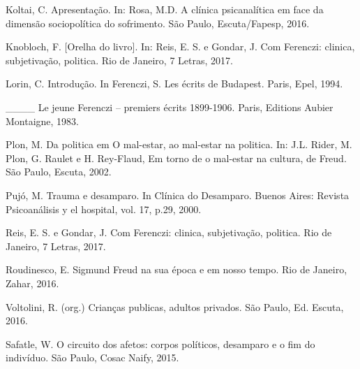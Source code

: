 Koltai, C. Apresentação. In: Rosa, M.D. A clínica psicanalítica em face
da dimensão sociopolítica do sofrimento. São Paulo, Escuta/Fapesp, 2016.

Knobloch, F. {[}Orelha do livro{]}. In: Reis, E. S. e Gondar, J. Com
Ferenczi: clinica, subjetivação, politica. Rio de Janeiro, 7 Letras,
2017.

Lorin, C. Introdução. In Ferenczi, S. Les écrits de Budapest. Paris,
Epel, 1994.

\_\_\_\_ Le jeune Ferenczi -- premiers écrits 1899-1906. Paris, Editions
Aubier Montaigne, 1983.

Plon, M. Da politica em O mal-estar, ao mal-estar na politica. In: J.L.
Rider, M. Plon, G. Raulet e H. Rey-Flaud, Em torno de o mal-estar na
cultura, de Freud. São Paulo, Escuta, 2002.

Pujó, M. Trauma e desamparo. In Clínica do Desamparo. Buenos Aires:
Revista Psicoanálisis y el hospital, vol. 17, p.29, 2000.

Reis, E. S. e Gondar, J. Com Ferenczi: clinica, subjetivação, politica.
Rio de Janeiro, 7 Letras, 2017.

Roudinesco, E. Sigmund Freud na sua época e em nosso tempo. Rio de
Janeiro, Zahar, 2016.

Voltolini, R. (org.) Crianças publicas, adultos privados. São Paulo, Ed.
Escuta, 2016.

Safatle, W. O circuito dos afetos: corpos políticos, desamparo e o fim
do indivíduo. São Paulo, Cosac Naify, 2015.
